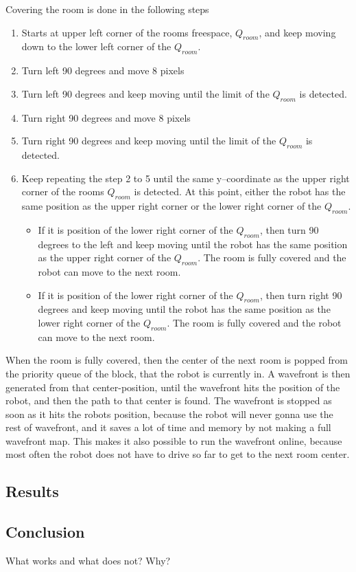 Covering the room is done in the following steps
\begin{enumerate}\itemsep-2pt
\item Starts at upper left corner of the rooms freespace, $Q_{room}$, and keep moving down to the lower left corner of the $Q_{room}$.
\item Turn left 90 degrees and move 8 pixels
\item Turn left 90 degrees and keep moving until the limit of the $Q_{room}$ is detected.
\item Turn right 90 degrees and move 8 pixels
\item Turn right 90 degrees and keep moving until the limit of the $Q_{room}$ is detected.
\item Keep repeating the step 2 to 5 until the same y--coordinate as the upper right corner of the rooms $Q_{room}$ is detected. At this point, either the robot has the same position as the upper right corner or the lower right corner of the $Q_{room}$.    
\begin{itemize}\itemsep-2pt  
\item If it is position of the lower right corner of the $Q_{room}$, then turn 90 degrees to the left and keep moving until the robot has the same position as the upper right corner of the $Q_{room}$. The room is fully covered and the robot can move to the next room.
\item If it is position of the lower right corner of the $Q_{room}$, then turn right 90 degrees and keep moving until the robot has the same position as the lower right corner of the $Q_{room}$. The room is fully covered and the robot can move to the next room. 
\end{itemize}
\end{enumerate} 
When the room is fully covered, then the center of the next room is popped from the priority queue of the block, that the robot is currently in. A wavefront is then generated from that center-position, until the wavefront hits the position of the robot, and then the path to that center is found. The wavefront is stopped as soon as it hits the robots position, because the robot will never gonna use the rest of wavefront, and it saves a lot of time and memory by not making a full wavefront map. This makes it also possible to run the wavefront online, because most often the robot does not have to drive so far to get to the next room center. 


\subsection{Results}

\subsection{Conclusion}
What works and what does not? Why?
